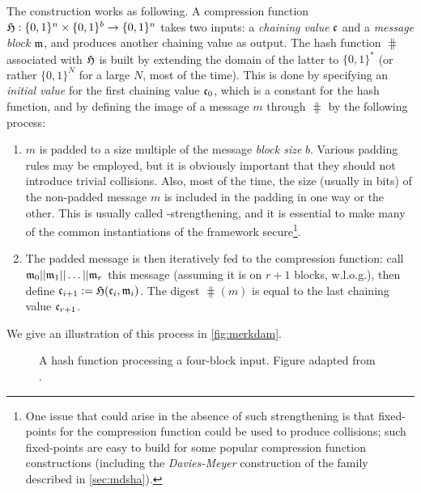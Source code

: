 The construction works as following. A compression function $\operatorname{\mathfrak{H}} : \{0,1\}^n \times \{0,1\}^b \rightarrow \{0,1\}^n$
takes two inputs: a \emph{chaining value} $\mathfrak{c}$ and a \emph{message block} $\mathfrak{m}$, and produces another chaining value as output.
The hash function $\hash$ associated with $\operatorname{\mathfrak{H}}$ is built by extending the domain of the latter to $\{0,1\}^*$ (or rather $\{0,1\}^N$ for a large $N$, most of the time).
This is done by specifying an \emph{initial value} \iv for the first chaining value $\mathfrak{c}_0$, which is a constant for the hash function, and by defining the image
of a message $m$ through $\hash$ by the following process:
\begin{enumerate}
\item $m$ is padded to a size multiple of the message \emph{block size} $b$. Various padding rules may be employed, but it is obviously important that they should not
introduce trivial collisions. Also, most of the time, the size (usually in bits) of the non-padded message $m$ is included in the padding in one way or the other.
This is usually called \merkdam-strengthening, and it is essential to make many of the common instantiations of the framework secure\footnote{One issue that
could arise in the absence of such strengthening is that fixed-points for the compression function could be used to produce collisions; such fixed-points
are easy to build for some popular compression function constructions (including the \emph{Davies-Meyer} construction
of the \mdsha family described in \autoref{sec:mdsha}).}.
\item The padded message is then iteratively fed to the compression function: call $\messblock_0||\messblock_1||\linebreak\ldots||\messblock_r$ this message (assuming
it is on $r+1$ blocks, w.l.o.g.), then define $\mathfrak{c}_{i+1} := \operatorname{\mathfrak{H}}(\mathfrak{c}_i, \mathfrak{m}_i)$. The digest $\hash(m)$ is equal to the last
chaining value $\mathfrak{c}_{r+1}$.
\end{enumerate}
We give an illustration of this process in \autoref{fig:merkdam}.

\begin{figure}[!htb]
\begin{center}

\caption[A \merkdam hash function processing a four-block input.]{A \merkdam hash function processing a four-block input. Figure adapted from \cite{TiKZ:Cryptographers}.\label{fig:merkdam}}
\end{center}
\end{figure} 

